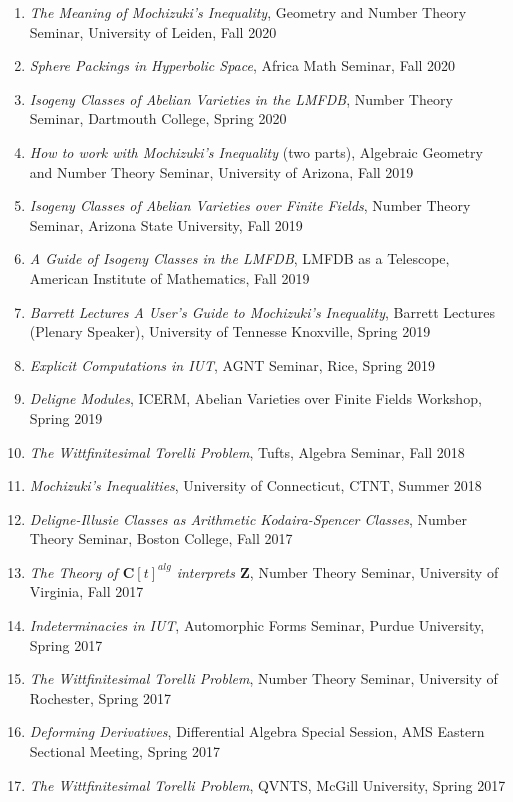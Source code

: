 \documentclass[a4paper,10pt]{article}
\newcommand{\CC}{\mathbf{C}}
\newcommand{\ZZ}{\mathbf{Z}}
\begin{document}
\begin{enumerate}
	\item \emph{The Meaning of Mochizuki’s Inequality}, Geometry and Number Theory Seminar, University of Leiden, Fall 2020
	\item \emph{Sphere Packings in Hyperbolic Space}, Africa Math Seminar, Fall 2020
	\item \emph{Isogeny Classes of Abelian Varieties in the LMFDB}, Number Theory Seminar, Dartmouth College, Spring 2020
	\item \emph{How to work with Mochizuki's Inequality} (two parts), Algebraic Geometry and Number Theory Seminar, University of Arizona, Fall 2019
	\item \emph{Isogeny Classes of Abelian Varieties over Finite Fields}, Number Theory Seminar, Arizona State University, Fall 2019
	\item \emph{A Guide of Isogeny Classes in the LMFDB}, LMFDB as a Telescope, American Institute of Mathematics, Fall 2019
	\item \emph{Barrett Lectures	A User's Guide to Mochizuki's Inequality}, Barrett Lectures (Plenary Speaker), University of Tennesse Knoxville, Spring 2019
	\item \emph{Explicit Computations in IUT}, AGNT Seminar, Rice, Spring 2019
	\item \emph{Deligne Modules}, ICERM, Abelian Varieties over Finite Fields Workshop, Spring 2019
	\item \emph{The Wittfinitesimal Torelli Problem}, Tufts, Algebra Seminar, Fall 2018
	\item \emph{Mochizuki's Inequalities}, University of Connecticut, CTNT, Summer 2018
	\item \emph{Deligne-Illusie Classes as Arithmetic Kodaira-Spencer Classes}, Number Theory Seminar, Boston College, Fall 2017
	\item \emph{The Theory of $\CC[t]^{alg}$ interprets $\ZZ$}, Number Theory Seminar, University of Virginia, Fall 2017
	\item \emph{Indeterminacies in IUT}, Automorphic Forms Seminar, Purdue University, Spring 2017
	\item \emph{The Wittfinitesimal Torelli Problem}, Number Theory Seminar, University of Rochester, Spring 2017 
	\item \emph{Deforming Derivatives}, Differential Algebra Special Session, AMS Eastern Sectional Meeting, Spring 2017
	\item \emph{The Wittfinitesimal Torelli Problem}, QVNTS, McGill University, Spring 2017 

\end{enumerate}
\end{document}
